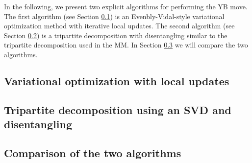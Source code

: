 In the following, we present two explicit algorithms for performing the YB move. The first algorithm (see Section \ref{sec:YB_move_iterative_local_optimization}) is an Evenbly-Vidal-style variational optimization method with iterative local updates. The second algorithm (see Section \ref{sec:YB_move_svd_disentangle}) is a tripartite decomposition with disentangling similar to the tripartite decomposition used in the MM. In Section \ref{sec:YB_move_comparison} we will compare the two algorithms.

\subsection{Variational optimization with local updates}
\label{sec:YB_move_iterative_local_optimization}


\subsection{Tripartite decomposition using an SVD and disentangling}
\label{sec:YB_move_svd_disentangle}


\subsection{Comparison of the two algorithms}
\label{sec:YB_move_comparison}
